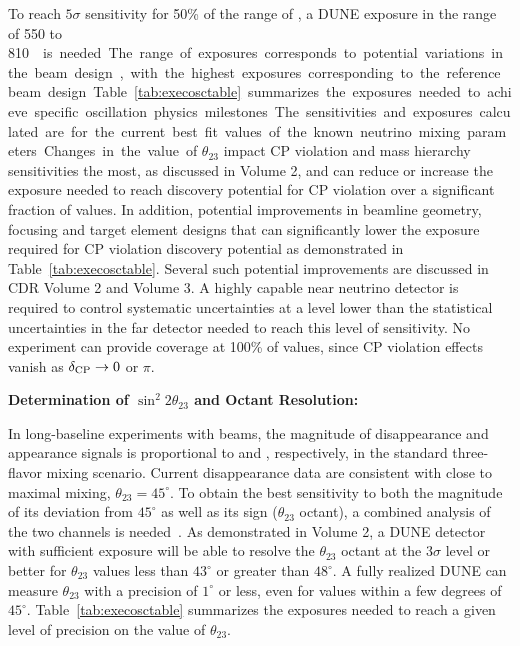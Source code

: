 To reach $5\sigma$ sensitivity for 50\% of the range of \deltacp, a
DUNE exposure in the range of \num{550} to \SI{810}\ktMWyr{}  is needed. The
range of exposures corresponds to potential variations in the beam
design, with the highest exposures corresponding to the reference beam
design. Table~\ref{tab:execosctable} summarizes the exposures needed to
achieve specific oscillation physics milestones.  The sensitivities
and exposures calculated are for the current best fit values of the
known neutrino mixing parameters. Changes in the value of
$\theta_{23}$ impact CP violation and mass hierarchy sensitivities the
most, as discussed in Volume 2, and can reduce or increase the exposure
needed to reach discovery potential for CP violation over a
significant fraction of \deltacp values. In addition, potential
improvements in beamline geometry, focusing and target element designs
that can significantly lower the exposure required for CP violation
discovery potential as demonstrated in Table~\ref{tab:execosctable}. Several such potential improvements are discussed
in CDR Volume 2 and Volume 3. A highly capable near neutrino detector
is required to control systematic uncertainties at a level lower than
the statistical uncertainties in the far detector needed to reach this
level of sensitivity.  No experiment can provide coverage at 100\% of
\deltacp values, since CP violation effects vanish as $\mdeltacp\to 0$
or $\pi$.

\textbf{\boldmath Determination of $\sin^2{2\theta_{23}}$ and Octant
  Resolution:} 
  
In long-baseline experiments with \numu beams, the
magnitude of \numu disappearance and \nue appearance signals is
proportional to  and ,
respectively, in the standard three-flavor mixing scenario.  Current
\numu disappearance data are consistent with close to maximal
mixing, $\theta_{23} = 45^\circ$.  To obtain the best sensitivity to
both the magnitude of its deviation from $45^\circ$ as well as its
sign ($\theta_{23}$ octant), a combined analysis of the two channels
is needed~\cite{Huber:2010dx}.  As demonstrated in Volume 2, a
 DUNE detector with sufficient exposure will be able to
resolve the $\theta_{23}$ octant at the $3\sigma$ level or better for
$\theta_{23}$ values less than $43^\circ$ or greater than $48^\circ$.
A fully realized DUNE can measure $\theta_{23}$ with a precision of
$1^\circ$ or less, even for values within a few degrees of
$45^\circ$. Table~\ref{tab:execosctable} summarizes the exposures
needed to reach a given level of precision on the value of
$\theta_{23}$.

